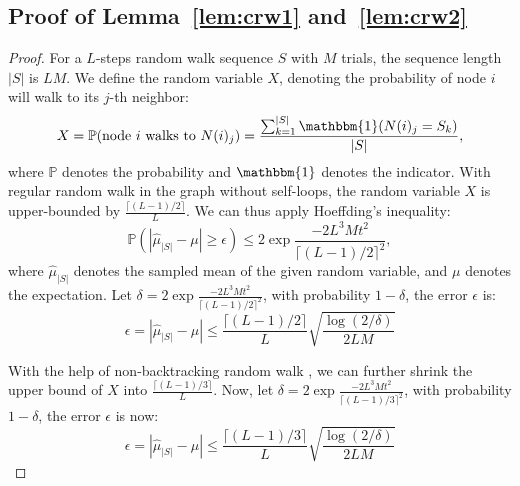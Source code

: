 \subsection{Proof of Lemma~\ref{lem:crw1} and~\ref{lem:crw2}}
\label{ap:subsec:prooflemma12}
\begin{proof}
For a $L$-steps random walk sequence $S$ with $M$ trials, the sequence length $|S|$ is $LM$. We define the random variable $X$, denoting the probability of node $i$ will walk to its $j$-th neighbor:
\begin{equation}
    X = \mathbb{P}(\text{node } i \text{ walks to } N(i)_{j}) = \frac{\sum_{k=1}^{|S|}{\mathbbm{1}(N(i)_{j} = S_{k})}}{|S|},
\end{equation}
where $\mathbb{P}$ denotes the probability and $\mathbbm{1}$ denotes the indicator. With regular random walk in the graph without self-loops, the random variable $X$ is upper-bounded by $\frac{\lceil (L - 1) / 2 \rceil}{L}$. We can thus apply Hoeffding's inequality:
\begin{equation}
    \mathbb{P}(|\hat{\mu}_{|S|} - \mu| \geq \epsilon) \leq 2\exp{\frac{-2L^{3}Mt^{2}}{\lceil (L - 1) / 2 \rceil^{2}}},
\end{equation}
where $\hat{\mu}_{|S|}$ denotes the sampled mean of the given random variable, and $\mu$ denotes the expectation. Let $\delta = 2\exp{\frac{-2L^{3}Mt^{2}}{\lceil (L - 1) / 2 \rceil^{2}}}$, with probability $1 - \delta$, the error $\epsilon$ is:
\begin{equation}
    \epsilon = |\hat{\mu}_{|S|} - \mu| \leq \frac{\lceil (L - 1) / 2 \rceil}{L} \sqrt{\frac{\log{(2/\delta)}}{2LM}}
\end{equation}

With the help of non-backtracking random walk \cite{alon2007non}, we can further shrink the upper bound of $X$ into $\frac{\lceil (L - 1) / 3 \rceil}{L}$. Now, let $\delta = 2\exp{\frac{-2L^{3}Mt^{2}}{\lceil (L - 1) / 3 \rceil^{2}}}$, with probability $1 - \delta$, the error $\epsilon$ is now:
\begin{equation}
    \epsilon = |\hat{\mu}_{|S|} - \mu| \leq \frac{\lceil (L - 1) / 3 \rceil}{L} \sqrt{\frac{\log{(2/\delta)}}{2LM}}
\end{equation}

\end{proof}


